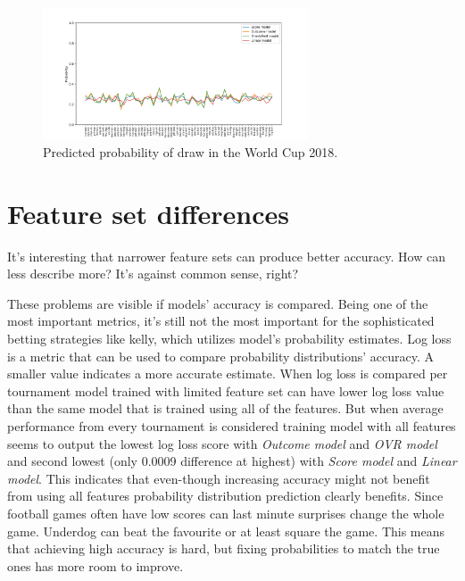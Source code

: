 \begin{figure}[H]
    \centering
    \includegraphics[width=0.7\textwidth]{img/match_level_2018_model_probability_draw_prob.png}
    \caption{Predicted probability of draw in the World Cup 2018.}
    \label{fig:draw_probability}
\end{figure}


\section{Feature set differences}
It's interesting that narrower feature sets can produce better accuracy. How can less describe more? It's against common sense, right?

These problems are visible if models' accuracy is compared. Being one of the most important metrics, it's still not the most important for the sophisticated betting strategies like kelly, which utilizes model's probability estimates. Log loss
is a metric that can be used to compare probability distributions' accuracy. A smaller value indicates a more accurate estimate. When log loss is compared per tournament model trained with limited feature set can have lower log loss value than the same model that is trained using all of the features. But when average performance from every tournament is considered training model with all features seems to output the lowest log loss score with \textit{Outcome model} and \textit{OVR model} and second lowest (only 0.0009 difference at highest) with \textit{Score model} and \textit{Linear model}. This indicates that even-though increasing accuracy might not benefit from using all features probability distribution prediction clearly benefits. Since football games often have low scores can last minute surprises change the whole game. Underdog can beat the favourite or at least square the game. This means that achieving high accuracy is hard, but fixing probabilities to match the true ones has more room to improve.

